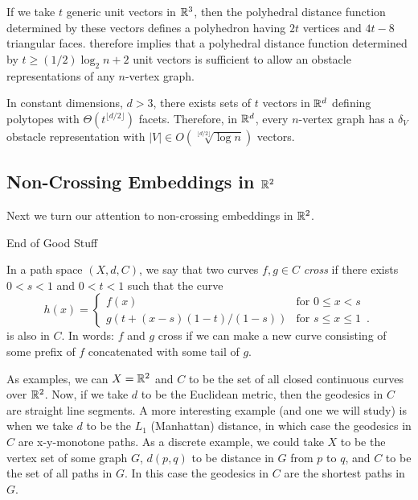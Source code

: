 \documentclass{patmorin}
\begin{document}
If we take $t$ generic unit vectors in $\mathbb{R}^3$, then the polyhedral
distance function determined by these vectors defines a polyhedron
having $2t$ vertices and $4t-8$ triangular faces.  
therefore implies that a polyhedral distance function determined by
$t\ge (1/2)\log_2 n +2$ unit vectors is sufficient to allow an obstacle
representations of any $n$-vertex graph.

In constant dimensions, $d>3$, there exists sets of $t$ vectors in
$\mathbb{R}^d$ defining polytopes with $\Theta(t^{\lfloor d/2\rfloor})$ facets.
Therefore, in $\mathbb{R}^d$, every $n$-vertex graph has a $\delta_V$ obstacle
representation with $|V|\in O(\sqrt[\lfloor d/2\rfloor]{\log n})$ vectors.

\subsection{Non-Crossing Embeddings in $\mathbb{R}^2$}

Next we turn our attention to non-crossing embeddings in $\mathbb{R}^2$.












\newpage

End of Good Stuff















In a path space $(X,d,C)$, we say that
two curves $f,g\in C$ \emph{cross} if there exists $0<s<1$ and $0<t<1$ such
that the curve
\[
    h(x) = \begin{cases} 
             f(x) & \text{for $0\le x< s$} \\
             g(t+(x-s)(1-t)/(1-s)) & \text{for $s\le x\le 1$} \enspace .
           \end{cases}
\]
is also in $C$. In words: $f$ and $g$ cross if we can make a new curve
consisting of some prefix of $f$ concatenated with some tail of $g$.

As examples, we can $X=\mathbb{R}^2$ and $C$ to be the set of all closed
continuous curves over $\mathbb{R}^2$.  Now, if we take $d$ to be the Euclidean
metric, then the geodesics in $C$ are straight line segments.  A more
interesting example (and one we will study) is when we take $d$ to be
the $L_1$ (Manhattan) distance, in which case the geodesics in $C$ are
x-y-monotone paths.  As a discrete example, we could take $X$ to be the
vertex set of some graph $G$, $d(p,q)$ to be distance in $G$ from $p$
to $q$, and $C$ to be the set of all paths in $G$. In this case the
geodesics in $C$ are the shortest paths in $G$.
\end{document}
